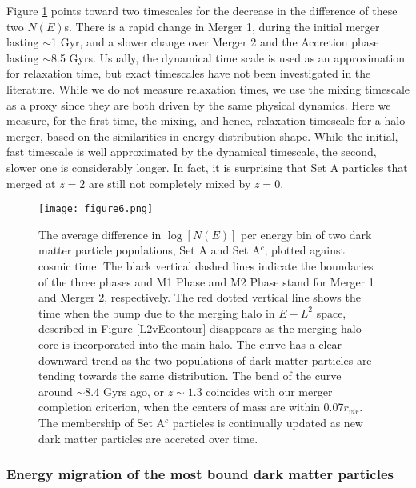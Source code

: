 \documentclass[a4paper,11pt]{article}
\begin{document}
Figure \ref{avediff} points toward two timescales for the decrease in the difference of these two $N(E)$s.  There is a rapid change in Merger 1, during the 
initial merger lasting $\sim$1 Gyr, and a slower change over Merger 2 and the Accretion phase lasting $\sim$8.5 Gyrs.  Usually, the dynamical time scale is used as an 
approximation for relaxation time, but exact timescales have not been investigated in the literature.  While we do not measure relaxation times, we use the 
mixing timescale as a proxy since they are both driven by the same physical dynamics.  Here we measure, for the first time, the mixing, and hence, relaxation timescale for a 
halo merger, based on the similarities in energy distribution shape.  While the initial, fast timescale is well approximated by the dynamical timescale, the 
second, slower one is considerably longer. In fact, it is surprising that Set A particles that merged at $z=2$ are still not completely mixed by $z=0$.

\begin{figure}
\centering
\texttt{[image: figure6.png]}
\caption{The average difference in $\log[N(E)]$ per energy bin of two dark matter particle populations, Set A and Set A$^c$, plotted against cosmic time.  
The black vertical dashed lines indicate the boundaries of the three phases and M1 Phase and M2 Phase stand for Merger 1 and Merger 2, 
respectively.  The red dotted vertical line shows the time when the bump due to the merging halo in $E-L^2$ space, described in Figure \ref{L2vEcontour} 
disappears as the merging halo core is incorporated into the main 
halo.  The curve has a clear downward trend as the two populations of dark matter particles are tending towards the same distribution.  The bend of the curve 
around $\sim$8.4 Gyrs ago, or $z\sim1.3$ coincides with our merger completion criterion, when the centers of mass are within 0.07$r_{vir}$.  The membership of Set A$^c$ 
particles is continually updated as new dark matter particles are accreted over time.}
\label{avediff}
\end{figure}


\subsubsection{Energy migration of the most bound dark matter particles}\label{DMmig}
\end{document}
